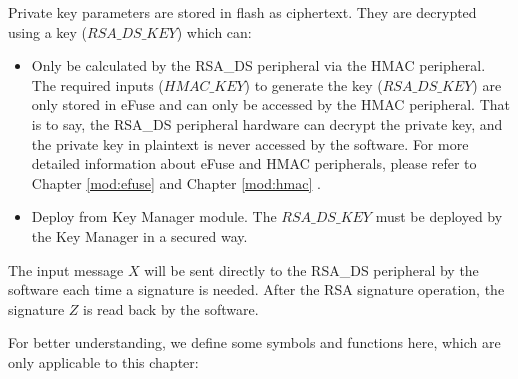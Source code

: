 \documentclass[main\_\_EN.tex]{subfiles}
\begin{document}
Private key parameters are stored in flash as ciphertext. They are decrypted using a key (\begin{math} RSA\_DS\_KEY \end{math}) which can:
\begin{itemize}
    \item Only be calculated by the RSA\_DS peripheral via the HMAC peripheral. The required inputs (\begin{math} HMAC\_KEY \end{math}) to generate the key (\begin{math}RSA\_DS\_KEY\end{math}) are only stored in eFuse and can only be accessed by the HMAC peripheral. That is to say, the RSA\_DS peripheral hardware can decrypt the private key, and the private key in plaintext is never accessed by the software. For more detailed information about eFuse and HMAC peripherals, please refer to Chapter \ref{mod:efuse} \textit{} and Chapter \ref{mod:hmac} \textit{}.
    \item Deploy from Key Manager module. The \begin{math} RSA\_DS\_KEY \end{math} must be deployed by the Key Manager in a secured way.
\end{itemize}



The input message \begin{math}X\end{math} will be sent directly to the RSA\_DS peripheral by the software each time a signature is needed. After the RSA signature operation, the signature \begin{math}Z\end{math} is read back by the software.

For better understanding, we define some symbols and functions here, which are only applicable to this chapter:
\end{document}

